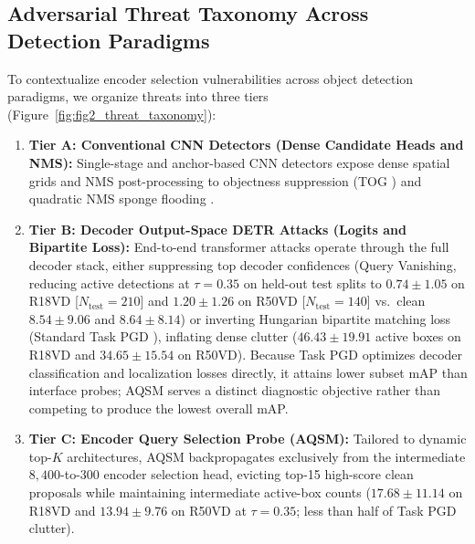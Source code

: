 \documentclass[preprint,10pt]{elsarticle}
\begin{document}
\subsection{Adversarial Threat Taxonomy Across Detection Paradigms}
To contextualize encoder selection vulnerabilities across object detection paradigms, we organize threats into three tiers (Figure~\ref{fig:fig2_threat_taxonomy}):
\begin{enumerate}
    \item \textbf{Tier A: Conventional CNN Detectors (Dense Candidate Heads and NMS):} Single-stage and anchor-based CNN detectors \citep{ren2015faster, redmon2016you} expose dense spatial grids and NMS post-processing to objectness suppression (TOG \citep{chow2020adversarial}) and quadratic NMS sponge flooding \citep{shumailov2021sponge, wang2021adversarial, chen2024overload, shapira2023phantom}.
    \item \textbf{Tier B: Decoder Output-Space DETR Attacks (Logits and Bipartite Loss):} End-to-end transformer attacks operate through the full decoder stack, either suppressing top decoder confidences (Query Vanishing, reducing active detections at $\tau = 0.35$ on held-out test splits to $0.74 \pm 1.05$ on R18VD [$N_{\mathrm{test}}=210$] and $1.20 \pm 1.26$ on R50VD [$N_{\mathrm{test}}=140$] vs.\ clean $8.54 \pm 9.06$ and $8.64 \pm 8.14$) or inverting Hungarian bipartite matching loss (Standard Task PGD \citep{nazeri2024evaluating}), inflating dense clutter ($46.43 \pm 19.91$ active boxes on R18VD and $34.65 \pm 15.54$ on R50VD). Because Task PGD optimizes decoder classification and localization losses directly, it attains lower subset mAP than interface probes; AQSM serves a distinct diagnostic objective rather than competing to produce the lowest overall mAP.
    \item \textbf{Tier C: Encoder Query Selection Probe (AQSM):} Tailored to dynamic top-$K$ architectures, AQSM backpropagates exclusively from the intermediate $8,400$-to-$300$ encoder selection head, evicting top-15 high-score clean proposals while maintaining intermediate active-box counts ($17.68 \pm 11.14$ on R18VD and $13.94 \pm 9.76$ on R50VD at $\tau = 0.35$; less than half of Task PGD clutter).
\end{enumerate}
\end{document}
